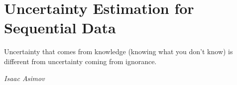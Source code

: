 \chapter{Uncertainty Estimation for Sequential Data}
\label{chap:sequential_data}

\epigraph{Uncertainty that comes from knowledge (knowing what you don't know) is different from uncertainty coming from ignorance.}{\textit{Isaac Asimov}}







